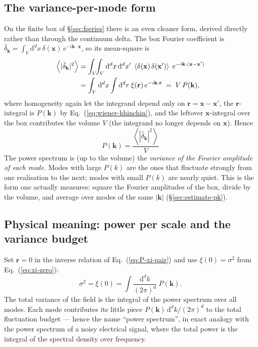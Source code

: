 \documentclass[12pt]{article}
\newcommand{\bk}{\mathbf{k}}
\newcommand{\bx}{\mathbf{x}}
\newcommand{\br}{\mathbf{r}}
\newcommand{\avg}[1]{\left\langle #1 \right\rangle}
\begin{document}
\subsection{The variance-per-mode form}
\label{sec:pk-variance}

On the finite box of \S\ref{sec:fseries} there is an even cleaner form,
derived directly rather than through the continuum delta.  The box
Fourier coefficient is $\hat\delta_\bk = \int_V \mathrm d^d x\,
\delta(\bx)\,e^{-i\bk\cdot\bx}$, so its mean-square is
\begin{align}
  \avg{|\hat\delta_\bk|^2}
  &= \int_V\!\!\int_V \mathrm d^d x\,\mathrm d^d x'\;
     \avg{\delta(\bx)\,\delta(\bx')}\;e^{-i\bk\cdot(\bx-\bx')} \notag\\
  &= \int_V \mathrm d^d x \int \mathrm d^d r\;\xi(\br)\,e^{-i\bk\cdot\br}
   \;=\; V\,P(\bk),
  \label{eq:pk-box-deriv}
\end{align}
where homogeneity again let the integrand depend only on
$\br = \bx - \bx'$, the $\br$-integral is $P(\bk)$ by
Eq.~(\ref{eq:wiener-khinchin}), and the leftover $\bx$-integral over the
box contributes the volume $V$ (the integrand no longer depends on
$\bx$).  Hence
\begin{equation}
  \boxed{\;P(\bk) = \frac{\avg{|\hat\delta_\bk|^2}}{V}\;}
  \label{eq:pk-var}
\end{equation}
The power spectrum is (up to the volume) the \emph{variance of the
Fourier amplitude of each mode}.  Modes with large $P(k)$ are the ones
that fluctuate strongly from one realisation to the next; modes with
small $P(k)$ are nearly quiet.  This is the form one actually measures:
square the Fourier amplitudes of the box, divide by the volume, and
average over modes of the same $|\bk|$ (\S\ref{sec:estimate-pk}).

\subsection{Physical meaning: power per scale and the variance budget}
\label{sec:pk-physical}

Set $\br = 0$ in the inverse relation of Eq.~(\ref{eq:P-xi-pair}) and use
$\xi(0) = \sigma^2$ from Eq.~(\ref{eq:xi-zero}):
\begin{equation}
  \sigma^2 = \xi(0) = \int \frac{\mathrm d^d k}{(2\pi)^d}\;P(\bk).
  \label{eq:sigma-integral}
\end{equation}
The total variance of the field is the integral of the power spectrum
over all modes.  Each mode contributes its little piece $P(\bk)\,\mathrm
d^d k/(2\pi)^d$ to the total fluctuation budget --- hence the name
``power spectrum'', in exact analogy with the power spectrum of a noisy
electrical signal, where the total power is the integral of the spectral
density over frequency.
\end{document}
